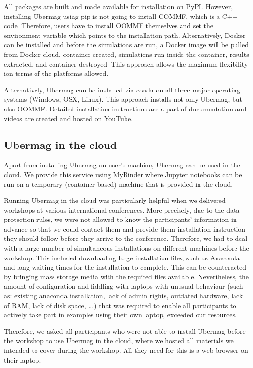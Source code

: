 \documentclass{deliverablereport}
\begin{document}
All packages are built and made available for installation on
PyPI. However, installing Ubermag using pip is not going to install
OOMMF, which is a C++ code. Therefore, users have to install OOMMF
themselves and set the environment variable which points to the
installation path. Alternatively, Docker can be installed and before
the simulations are run, a Docker image will be pulled from Docker
cloud, container created, simulations run inside the container,
results extracted, and container destroyed. This approach allows the
maximum flexibility ion terms of the platforms allowed.

Alternatively, Ubermag can be installed via conda on all three major
operating systems (Windows, OSX, Linux). This approach installs not
only Ubermag, but also OOMMF. Detailed installation instructions are a
part of documentation and videos are created and hosted on YouTube.

\subsection{Ubermag in the cloud}

Apart from installing Ubermag on user's machine, Ubermag can be used
in the cloud. We provide this service using MyBinder where Jupyter
notebooks can be run on a temporary (container based) machine that is
provided in the cloud.

Running Ubermag in the cloud was particularly helpful when we
delivered workshops at various international conferences. More
precisely, due to the data protection rules, we were not allowed to
know the participants' information in advance so that we could contact
them and provide them installation instruction they should follow
before they arrive to the conference. Therefore, we had to deal with a
large number of simultaneous installations on different machines
before the workshop. This included downloading large installation
files, such as Anaconda and long waiting times for the installation to
complete. This can be counteracted by bringing mass storage media with
the required files available. Nevertheless, the amount of
configuration and fiddling with laptops with unusual behaviour (such
as: existing anaconda installation, lack of admin rights, outdated
hardware, lack of RAM, lack of disk space, ...) that was required to
enable all participants to actively take part in examples using their
own laptop, exceeded our resources.

Therefore, we asked all participants who were not able to
install Ubermag before the workshop to use Ubermag in the cloud, where
we hosted all materials we intended to cover during the workshop. All
they need for this is a web browser on their laptop.
\end{document}
